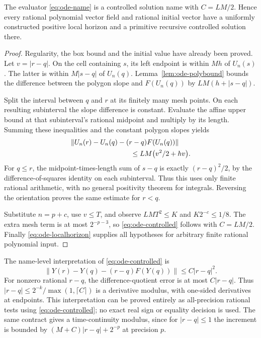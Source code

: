\begin{theorem}
\label{thm:ode-existence}
The evaluator \eqref{eq:ode-name} is a controlled solution name with
$C=LM/2$.  Hence every rational polynomial vector field and rational
initial vector have a uniformly constructed positive local horizon and
a primitive recursive controlled solution there.
\end{theorem}
\begin{proof}
Regularity, the box bound and the initial value have already been proved.
Let $v=|r-q|$.  On the cell containing $s$, its left endpoint is within
$Mh$ of $U_n(s)$.  The latter is within $M|s-q|$ of $U_n(q)$.
Lemma~\ref{lem:ode-polybound} bounds the difference between the polygon
slope and $F(U_n(q))$ by $LM(h+|s-q|)$.

Split the interval between $q$ and $r$ at its finitely many mesh points.
On each resulting subinterval the slope difference is constant.  Evaluate
the affine upper bound at that subinterval's rational midpoint and multiply
by its length.  Summing these inequalities and the constant polygon slopes
yields
\begin{equation}
 \begin{split}
 &\lVert U_n(r)-U_n(q)-(r-q)F(U_n(q))\rVert\\
 &\hspace{30mm}\le LM\bigl(v^2/2+hv\bigr).
 \end{split}
 \label{eq:ode-localdefect}
\end{equation}
For $q\le r$, the midpoint-times-length sum of $s-q$ is exactly
$(r-q)^2/2$, by the difference-of-squares identity on each subinterval.
Thus this uses only finite rational arithmetic, with no general positivity
theorem for integrals.  Reversing the orientation proves
the same estimate for $r<q$.

Substitute $n=p+c$, use $v\le T$, and observe
$LMT^2\le K$ and $K2^{-c}\le1/8$.  The extra mesh term is at most
$2^{-p-3}$, so \eqref{eq:ode-controlled} follows with $C=LM/2$.
Finally \eqref{eq:ode-localhorizon} supplies all hypotheses for arbitrary
finite rational polynomial input.
\end{proof}

The name-level interpretation of \eqref{eq:ode-controlled} is
\[
 \lVert Y(r)-Y(q)-(r-q)F(Y(q))\rVert\le C|r-q|^2.
\]
For nonzero rational $r-q$, the difference-quotient error is at most
$C|r-q|$.  Thus
$|r-q|\le2^{-k}/\max(1,\lceil C\rceil)$ is a derivative modulus,
with one-sided derivatives at endpoints.  This interpretation can be
proved entirely as all-precision rational tests using
\eqref{eq:ode-controlled}; no exact real sign or equality decision is used.
The same contract gives a time-continuity modulus, since for $|r-q|\le1$
the increment is bounded by $(M+C)|r-q|+2^{-p}$ at precision $p$.

